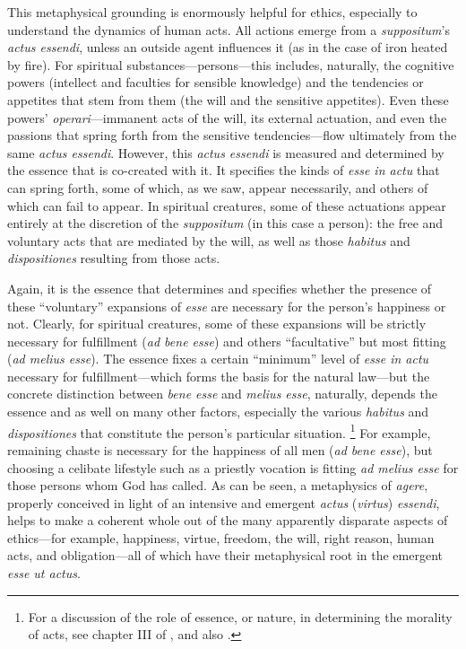 This metaphysical grounding is enormously helpful for ethics, especially to understand the dynamics of human acts. All actions emerge from a \emph{suppositum}’s \emph{actus essendi}, unless an outside agent influences it (as in the case of iron heated by fire). For spiritual substances—persons—this includes, naturally, the cognitive powers (intellect and faculties for sensible knowledge) and the tendencies or appetites that stem from them (the will and the sensitive appetites). Even these powers’ \emph{operari}—immanent acts of the will, its external actuation, and even the passions that spring forth from the sensitive tendencies—flow ultimately from the same \emph{actus essendi}. However, this \emph{actus essendi} is measured and determined by the essence that is co-created with it. It specifies the kinds of \emph{esse in actu} that can spring forth, some of which, as we saw, appear necessarily, and others of which can fail to appear. In spiritual creatures, some of these actuations appear entirely at the discretion of the \emph{suppositum} (in this case a person): the free and voluntary acts that are mediated by the will, as well as those \emph{habitus} and \emph{dispositiones} resulting from those acts.

Again, it is the essence that determines and specifies whether the presence of these “voluntary” expansions of \emph{esse} are necessary for the person’s happiness or not. Clearly, for spiritual creatures, some of these expansions will be strictly necessary for fulfillment (\emph{ad bene esse}) and others “facultative” but most fitting (\emph{ad melius esse}). The essence fixes a certain “minimum” level of \emph{esse in actu} necessary for fulfillment—which forms the basis for the natural law—but the concrete distinction between \emph{bene esse} and \emph{melius esse}, naturally, depends the essence and as well on many other factors, especially the various \emph{habitus} and \emph{dispositiones} that constitute the person’s particular situation.%
%
\footnote{For a discussion of the role of essence, or nature, in determining the morality of acts, see chapter III of \cite[31–44]{lucas:absoluto}, and also \cite[459–475]{millan-puelles:libre}.}
%
For example, remaining chaste is necessary for the happiness of all men (\emph{ad bene esse}), but choosing a celibate lifestyle such as a priestly vocation is fitting \emph{ad melius esse} for those persons whom God has called. As can be seen, a metaphysics of \emph{agere}, properly conceived in light of an intensive and emergent \emph{actus} (\emph{virtus}) \emph{essendi}, helps to make a coherent whole out of the many apparently disparate aspects of ethics—for example, happiness, virtue, freedom, the will, right reason, human acts, and obligation—all of which have their metaphysical root in the emergent \emph{esse ut actus}.

